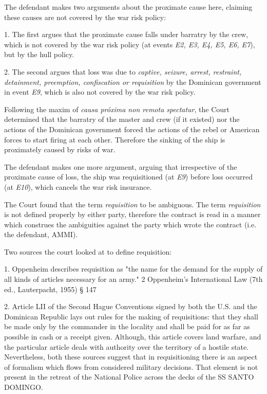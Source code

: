    The defendant makes two arguments about the proximate cause here, claiming these causes are not covered by the war risk policy:
    
    1. The first argues that the proximate cause falls under barratry by the crew, which is not covered by the war risk policy (at events \textit{E2, E3, E4, E5, E6, E7}), but by the hull policy.
    
    2. The second argues that loss was due to \textit{captive, seizure, arrest, restraint, detainment, preemption, confiscation or requisition} by the Dominican government in event \textit{E9}, which is also not covered by the war risk policy.
    
    Following the maxim of \textit{causa próxima non remota spectatur}, the Court determined that the barratry of the master and crew (if it existed) nor the actions of the Dominican government forced the actions of the rebel or American forces to start firing at each other. Therefore the sinking of the ship is proximately caused by risks of war.
    
    The defendant makes one more argument, arguing that irrespective of the proximate cause of loss, the ship was requisitioned (at \textit{E9}) before loss occurred (at \textit{E10}), which cancels the war risk insurance.
            
    The Court found that the term \textit{requisition} to be ambiguous. The term \textit{requisition} is not defined properly by either party, therefore the contract is read in a manner which construes the ambiguities against the party which wrote the contract (i.e. the defendant, AMMI). 
    
    Two sources the court looked at to define requisition:
    
    1. Oppenheim describes requisition as "the name for the demand for the supply of all kinds of articles necessary for an army." 2 Oppenheim's International Law (7th ed., Lauterpacht, 1955) § 147
    
    2. Article LII of the Second Hague Conventions signed by both the U.S. and the Dominican Republic lays out rules for the making of requisitions: that they shall be made only by the commander in the locality and shall be paid for as far as possible in cash or a receipt given. Although, this article covers land warfare, and the particular article deals with authority over the territory of a hostile state. Nevertheless, both these sources suggest that in requisitioning there is an aspect of formalism which flows from considered military decisions. That element is not present in the retreat of the National Police across the decks of the SS SANTO DOMINGO.
     
